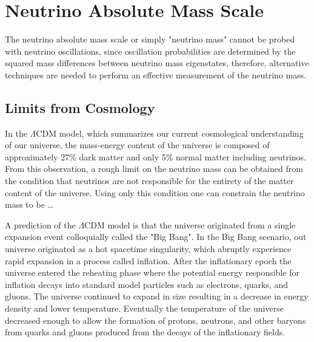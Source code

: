 \section{Neutrino Absolute Mass Scale}
\label{sec:chap2-nu-mass-scale}

The neutrino absolute mass scale or simply "neutrino mass" cannot be probed with neutrino oscillations, since oscillation probabilities are determined by the squared mass differences between neutrino mass eigenstates, therefore, alternative techniques are needed to perform an effective measurement of the neutrino mass.

\subsection{Limits from Cosmology}

In the $\Lambda$CDM model, which summarizes our current cosmological understanding of our universe, the mass-energy content of the universe is composed of approximately 27\% dark matter and only 5\% normal matter including neutrinos. From this observation, a rough limit on the neutrino mass can be obtained from the condition that neutrinos are not responsible for the entirety of the matter content of the universe. Using only this condition one can constrain the neutrino mass to be \ldots

A prediction of the $\Lambda$CDM model is that the universe originated from a single expansion event colloquially called the "Big Bang". In the Big Bang scenario, out universe originated as a hot spacetime singularity, which abruptly experience rapid expansion in a process called inflation. After the inflationary epoch the universe entered the reheating phase where the potential energy responsible for inflation decays into standard model particles such as electrons, quarks, and gluons. The universe continued to expand in size resulting in a decrease in energy density and lower temperature. Eventually the temperature of the universe decreased enough to allow the formation of protons, neutrons, and other baryons from quarks and gluons produced from the decays of the inflationary fields.

